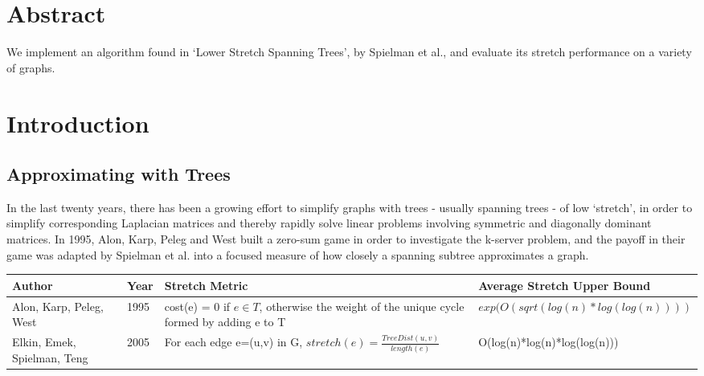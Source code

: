 \documentclass{article}
\title{\cTitle}
\author{\cAuthor}
\begin{document}
\maketitle

\section*{Abstract}
We implement an algorithm found in `Lower Stretch Spanning Trees', by Spielman et al., and evaluate its stretch performance on a variety of graphs.
\section*{Introduction}
\subsection*{Approximating with Trees}
In the last twenty years, there has been a growing effort to simplify graphs with trees - usually spanning trees - of low `stretch', in order to simplify corresponding Laplacian matrices and thereby rapidly solve linear problems involving symmetric and diagonally dominant matrices.
In 1995, Alon, Karp, Peleg and West\cite{akpw:game} built a zero-sum game in order to investigate the k-server problem\cite{wiki:kserver}, and the payoff in their game was adapted by Spielman et al.\cite{spielman:lower-stretch} into a focused measure of how closely a spanning subtree approximates a graph.

\begin{table}
    \begin{tabular}{|p{3cm}|l|p{5cm}|l|}
    \hline
    Author                      &         Year &                Stretch Metric                                                                              & Average Stretch Upper Bound                             \\ \hline
    Alon, Karp, Peleg, West     & 1995 &           cost(e) = 0 if $e \in T$, otherwise the weight of the unique cycle formed by adding e to T  &                         $exp(O(sqrt(log(n)*log(log(n))))$ \\ \hline
    Elkin, Emek, Spielman, Teng & 2005 & For each edge e=(u,v) in G, $stretch(e) = \frac{TreeDist(u,v)}{length(e)}$                            & O(log(n)*log(n)*log(log(n)))                            \\ \hline
    \end{tabular}
\end{table}
\end{document}
